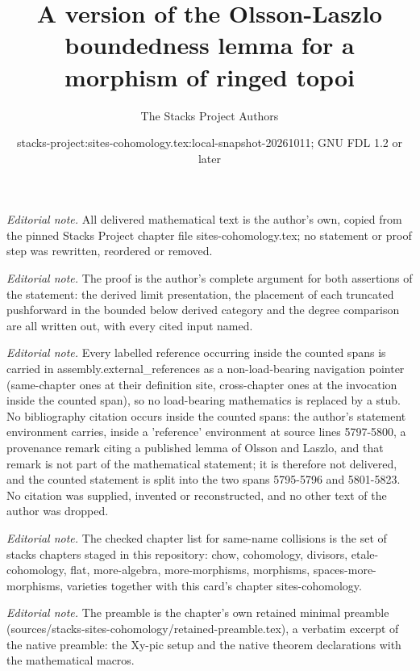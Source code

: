 \documentclass[10pt,a4paper]{amsart}
\title{A version of the Olsson-Laszlo boundedness lemma for a morphism of ringed topoi}
\author{The Stacks Project Authors}
\date{stacks-project:sites-cohomology.tex:local-snapshot-20261011; GNU FDL 1.2 or later}
\theoremstyle{plain}
\theoremstyle{definition}
\theoremstyle{remark}
\numberwithin{equation}{subsection}
\begin{document}
\maketitle
\noindent\textit{Editorial note.} All delivered mathematical text is the author's own, copied from the pinned Stacks Project chapter file sites-cohomology.tex; no statement or proof step was rewritten, reordered or removed.\par\medskip
\noindent\textit{Editorial note.} The proof is the author's complete argument for both assertions of the statement: the derived limit presentation, the placement of each truncated pushforward in the bounded below derived category and the degree comparison are all written out, with every cited input named.\par\medskip
\noindent\textit{Editorial note.} Every labelled reference occurring inside the counted spans is carried in assembly.external\_references as a non-load-bearing navigation pointer (same-chapter ones at their definition site, cross-chapter ones at the invocation inside the counted span), so no load-bearing mathematics is replaced by a stub. No bibliography citation occurs inside the counted spans: the author's statement environment carries, inside a 'reference' environment at source lines 5797-5800, a provenance remark citing a published lemma of Olsson and Laszlo, and that remark is not part of the mathematical statement; it is therefore not delivered, and the counted statement is split into the two spans 5795-5796 and 5801-5823. No citation was supplied, invented or reconstructed, and no other text of the author was dropped.\par\medskip
\noindent\textit{Editorial note.} The checked chapter list for same-name collisions is the set of stacks chapters staged in this repository: chow, cohomology, divisors, etale-cohomology, flat, more-algebra, more-morphisms, morphisms, spaces-more-morphisms, varieties together with this card's chapter sites-cohomology.\par\medskip
\noindent\textit{Editorial note.} The preamble is the chapter's own retained minimal preamble (sources/stacks-sites-cohomology/retained-preamble.tex), a verbatim excerpt of the native preamble: the Xy-pic setup and the native theorem declarations with the mathematical macros.\par\medskip
\end{document}
